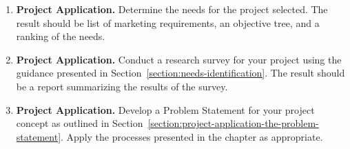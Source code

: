 \begin{enumerate}
\item
  \textbf{Project Application.} Determine the needs for the project
  selected. The result should be list of marketing requirements, an
  objective tree, and a ranking of the needs.
\item
  \textbf{Project Application.} Conduct a research survey for your
  project using the guidance presented in Section~\ref{section:needs-identification}. The result should
  be a report summarizing the results of the survey.
\item
  \textbf{Project Application.} Develop a Problem Statement for your
  project concept as outlined in Section~\ref{section:project-application-the-problem-statement}. 
  Apply the processes
  presented in the chapter as appropriate.
\end{enumerate}
